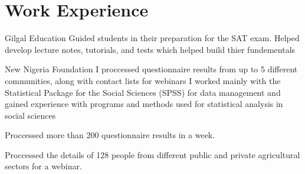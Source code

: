 \section{Work Experience}
\begin{experience}{Gilgal Education}{
}
Guided students in their preparation for the SAT exam.
Helped develop lecture notes, tutorials, and tests which helped build thier fundementals

\end{experience}

\begin{experience}{New Nigeria Foundation}{
}
I proccessed questionnaire results from up to 5 different communities, along with contact lists for webinars
I worked mainly with the Statistical Package for the Social Sciences (SPSS) for data management and gained experience with programs and methods used for statistical analysis in social sciences


\begin{contribs}
	\item{Proccessed more than 200 questionnaire results in a week.}
	\item{Proccessed the details of 128 people from different public and private agricultural sectors for a webinar.}
\end{contribs}
\end{experience}



